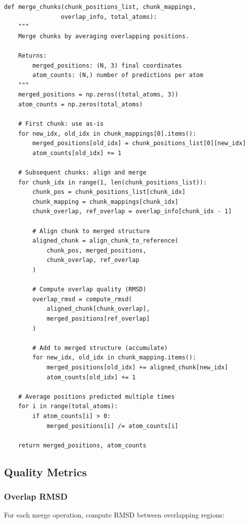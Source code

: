 \documentclass[11pt,a4paper]{article}
\begin{document}
\begin{lstlisting}[caption={Merge Chunks with Averaging}]
def merge_chunks(chunk_positions_list, chunk_mappings,
                overlap_info, total_atoms):
    """
    Merge chunks by averaging overlapping positions.

    Returns:
        merged_positions: (N, 3) final coordinates
        atom_counts: (N,) number of predictions per atom
    """
    merged_positions = np.zeros((total_atoms, 3))
    atom_counts = np.zeros(total_atoms)

    # First chunk: use as-is
    for new_idx, old_idx in chunk_mappings[0].items():
        merged_positions[old_idx] = chunk_positions_list[0][new_idx]
        atom_counts[old_idx] += 1

    # Subsequent chunks: align and merge
    for chunk_idx in range(1, len(chunk_positions_list)):
        chunk_pos = chunk_positions_list[chunk_idx]
        chunk_mapping = chunk_mappings[chunk_idx]
        chunk_overlap, ref_overlap = overlap_info[chunk_idx - 1]

        # Align chunk to merged structure
        aligned_chunk = align_chunk_to_reference(
            chunk_pos, merged_positions,
            chunk_overlap, ref_overlap
        )

        # Compute overlap quality (RMSD)
        overlap_rmsd = compute_rmsd(
            aligned_chunk[chunk_overlap],
            merged_positions[ref_overlap]
        )

        # Add to merged structure (accumulate)
        for new_idx, old_idx in chunk_mapping.items():
            merged_positions[old_idx] += aligned_chunk[new_idx]
            atom_counts[old_idx] += 1

    # Average positions predicted multiple times
    for i in range(total_atoms):
        if atom_counts[i] > 0:
            merged_positions[i] /= atom_counts[i]

    return merged_positions, atom_counts
\end{lstlisting}

\subsection{Quality Metrics}

\subsubsection{Overlap RMSD}

For each merge operation, compute RMSD between overlapping regions:
\end{document}
